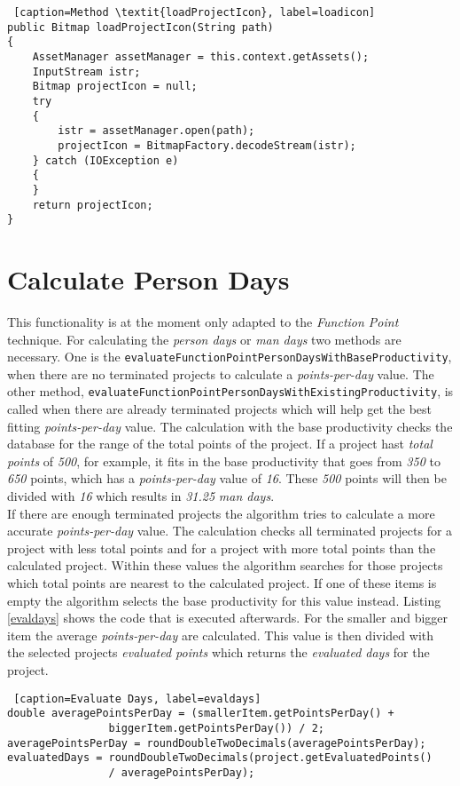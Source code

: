\begin{lstlisting} [caption=Method \textit{loadProjectIcon}, label=loadicon] 
public Bitmap loadProjectIcon(String path)
{
	AssetManager assetManager = this.context.getAssets();
	InputStream istr;
	Bitmap projectIcon = null;
	try
	{
		istr = assetManager.open(path);
		projectIcon = BitmapFactory.decodeStream(istr);
	} catch (IOException e)
	{
	}
	return projectIcon;
}
\end{lstlisting}
\section{Calculate Person Days}

This functionality is at the moment only adapted to the \textit{Function Point} technique. For calculating the \textit{person days} or \textit{man days} two methods are necessary. One is the \texttt{evaluateFunctionPointPersonDaysWithBaseProductivity}, when there are no terminated projects to calculate a \textit{points-per-day} value. The other method, \texttt{evaluateFunctionPointPersonDaysWithExistingProductivity}, is called when there are already terminated projects which will help get the best fitting \textit{points-per-day} value. The calculation with the base productivity checks the database for the range of the total points of the project. If a project hast \textit{total points} of \textit{500}, for example, it fits in the base productivity that goes from \textit{350} to \textit{650} points, which has a \textit{points-per-day} value of \textit{16}. These \textit{500} points will then be divided with \textit{16} which results in \textit{31.25} \textit{man days}.\\
If there are enough terminated projects the algorithm tries to calculate a more accurate \textit{points-per-day} value. The calculation checks all terminated projects for a project with less total points and for a project with more total points than the calculated project. Within these values the algorithm searches for those projects which total points are nearest to the calculated project. If one of these items is empty the algorithm selects the base productivity for this value instead. Listing \ref{evaldays} shows the code that is executed afterwards. For the smaller and bigger item the average \textit{points-per-day} are calculated. This value is then divided with the selected projects \textit{evaluated points} which returns the \textit{evaluated days} for the project.
\begin{lstlisting} [caption=Evaluate Days, label=evaldays] 
double averagePointsPerDay = (smallerItem.getPointsPerDay() + 
				biggerItem.getPointsPerDay()) / 2;
averagePointsPerDay = roundDoubleTwoDecimals(averagePointsPerDay);
evaluatedDays = roundDoubleTwoDecimals(project.getEvaluatedPoints() 
				/ averagePointsPerDay);
\end{lstlisting}
